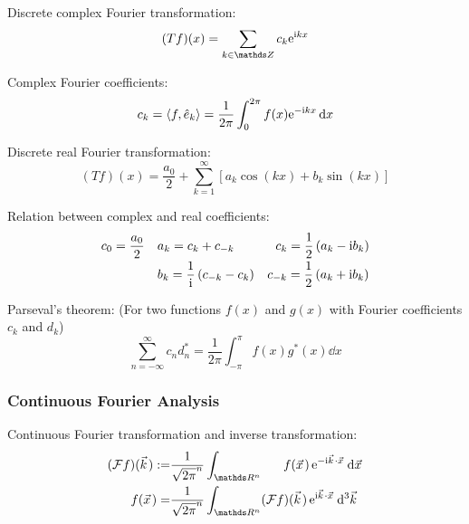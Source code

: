 			\noindent
			Discrete complex Fourier transformation:
			\begin{equation}
				(Tf)(x)=\sum_{k\in\integers}c_k \ex^{\i kx}
			\end{equation}

			\noindent
			Complex Fourier coefficients:
			\begin{equation}
				c_k = \left<f,\hat{e}_k\right>=\frac{1}{2\pi}\int_0^{2\pi}f(x)\mathrm{e}^{-\mathrm{i} kx}\dd{x}
			\end{equation}

			\noindent
			Discrete real Fourier transformation:
			\begin{equation}
				(Tf)(x)=\frac{a_0}{2}+\sum_{k=1}^{\infty}\left[a_k \cos(kx) + b_k \sin(kx) \right]
			\end{equation}

			\noindent
			Relation between complex and real coefficients:
			\begin{equation}
				\begin{array}{clc}
					c_0 = \dfrac{a_0}{2} & a_k = c_k+c_{-k} & \phantom{_{-}}c_k = \dfrac{1}{2}\left(a_k-\i b_k\right) \\ [6pt]
					& b_k = \dfrac{1}{\i}\left(c_{-k}-c_{k}\right) & c_{-k} = \dfrac{1}{2}\left(a_k+\i b_k\right)
				\end{array}
			\end{equation}

			\noindent
			Parseval's theorem: (For two functions $f(x)$ and $g(x)$ with Fourier coefficients $c_k$ and $d_k$)
			\begin{equation}
				\sum_{n=-\infty}^{\infty} c_n d_n^* = \frac{1}{2\pi}\int_{-\pi}^{\pi} f(x)g^*(x)\dd{x}
			\end{equation}

		\subsubsection{Continuous Fourier Analysis}
			\noindent
			Continuous Fourier transformation and inverse transformation:
			\begin{equation}
				\begin{aligned}
					(\mathcal{F}f)(\vec{k}) :=& \frac{1}{\sqrt{2\pi}^n}\int_{\reals ^n} \phantom{(\mathcal{F})}f(\vec{x})\, \ex^{-\i\vec{k}\cdot\vec{x}}\dd{\vec{x}} \\
					\phantom{(\mathcal{F})}f(\vec{x}) =& \frac{1}{\sqrt{2\pi}^n}\int_{\reals ^n} (\mathcal{F}f)(\vec{k}) \,\ex^{\i\vec{k}\cdot\vec{x}}\dd[3]{\vec{k}} \\
				\end{aligned}
			\end{equation}

